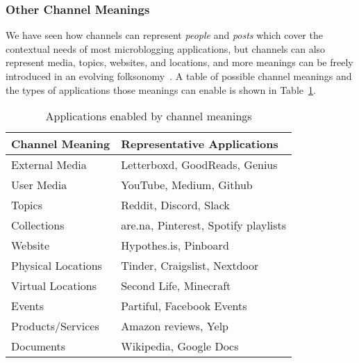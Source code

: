 

\subsubsection{Other Channel Meanings}

We have seen how channels can represent \emph{people} and \emph{posts}
which cover the contextual needs of most microblogging applications,
but channels can also represent media, topics, websites, and locations,
and more meanings can be freely introduced in an evolving folksonomy~\cite{folksonomy}.
A table of possible channel meanings and the types of applications
those meanings can enable is shown in Table~\ref{concepts:channels-and-applications}.


\begin{table}[h]
\small
\caption{Applications enabled by channel meanings}
\label{concepts:channels-and-applications}
\centering
\begin{tabular}{|l|l|}
\hline
\textbf{Channel Meaning} & \textbf{Representative Applications} \\ \hline
External Media & Letterboxd, GoodReads, Genius \\ \hline
User Media & YouTube, Medium, Github \\ \hline
Topics & Reddit, Discord, Slack \\ \hline
Collections & are.na, Pinterest, Spotify playlists \\ \hline
Website & Hypothes.is, Pinboard \\ \hline
Physical Locations & Tinder, Craigslist, Nextdoor \\ \hline
Virtual Locations & Second Life, Minecraft \\ \hline
Events & Partiful, Facebook Events \\ \hline
Products/Services & Amazon reviews, Yelp \\ \hline
Documents & Wikipedia, Google Docs \\ \hline
\end{tabular}
\end{table}

